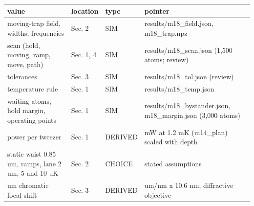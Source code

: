 {\footnotesize
\begin{longtable}[]{@{}>{\raggedright\arraybackslash}p{0.300\dimexpr(\linewidth-8\tabcolsep)\relax}>{\raggedright\arraybackslash}p{0.129\dimexpr(\linewidth-8\tabcolsep)\relax}>{\raggedright\arraybackslash}p{0.112\dimexpr(\linewidth-8\tabcolsep)\relax}>{\raggedright\arraybackslash}p{0.459\dimexpr(\linewidth-8\tabcolsep)\relax}@{}}
\toprule\noalign{}
value & location & type & pointer \\
\midrule\noalign{}
\endhead
\bottomrule\noalign{}
\endlastfoot
moving-trap field, widths, frequencies & Sec. 2 & SIM &
results/m18\_field.json, m18\_trap.npz \\
scan (hold, moving, ramp, move, path) & Sec. 1, 4 & SIM &
results/m18\_scan.json (1,500 atoms; review) \\
tolerances & Sec. 3 & SIM & results/m18\_tol.json (review) \\
temperature rule & Sec. 1 & SIM & results/m18\_temp.json \\
waiting atoms, hold margin, operating points & Sec. 1 & SIM &
results/m18\_bystander.json, m18\_margin.json (3,000 atoms) \\
power per tweezer & Sec. 1 & DERIVED & 57 mW at 1.2 mK (m14\_plan)
scaled with depth \\
static waist 0.85 um, ramps, lane 2 um, 5 and 10 uK & Sec. 2 & CHOICE &
stated assumptions \\
170 um chromatic focal shift & Sec. 3 & DERIVED & 16 um/nm x 10.6 nm,
diffractive objective \\
\end{longtable}
}
